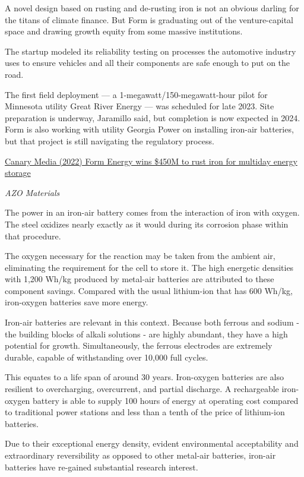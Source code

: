 \documentclass[
]{book}
\begin{document}
A novel design based on rusting and de-rusting iron is not an obvious darling for the titans of climate finance. But Form is graduating out of the venture-capital space and drawing growth equity from some massive institutions.

The startup modeled its reliability testing on processes the automotive industry uses to ensure vehicles and all their components are safe enough to put on the road.

The first field deployment --- a 1-megawatt/150-megawatt-hour pilot for Minnesota utility Great River Energy --- was scheduled for late 2023. Site preparation is underway, Jaramillo said, but completion is now expected in 2024. Form is also working with utility Georgia Power on installing iron-air batteries, but that project is still navigating the regulatory process.

\href{https://www.canarymedia.com/articles/long-duration-energy-storage/form-energy-wins-450m-to-rust-iron-for-multiday-energy-storage}{Canary Media (2022) Form Energy wins \$450M to rust iron for multiday energy storage}

\emph{AZO Materials}

The power in an iron-air battery comes from the interaction of iron with oxygen. The steel oxidizes nearly exactly as it would during its corrosion phase within that procedure.

The oxygen necessary for the reaction may be taken from the ambient air, eliminating the requirement for the cell to store it. The high energetic densities with 1,200 Wh/kg produced by metal-air batteries are attributed to these component savings. Compared with the usual lithium-ion that has 600 Wh/kg, iron-oxygen batteries save more energy.

Iron-air batteries are relevant in this context. Because both ferrous and sodium - the building blocks of alkali solutions - are highly abundant, they have a high potential for growth. Simultaneously, the ferrous electrodes are extremely durable, capable of withstanding over 10,000 full cycles.

This equates to a life span of around 30 years. Iron-oxygen batteries are also resilient to overcharging, overcurrent, and partial discharge. A rechargeable iron-oxygen battery is able to supply 100 hours of energy at operating cost compared to traditional power stations and less than a tenth of the price of lithium-ion batteries.

Due to their exceptional energy density, evident environmental acceptability and extraordinary reversibility as opposed to other metal-air batteries, iron-air batteries have re-gained substantial research interest.
\end{document}
